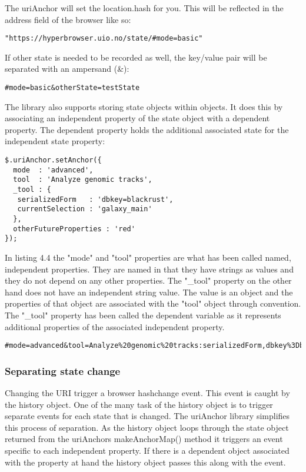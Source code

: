 \documentclass[english]{ifimaster}
\begin{document}
The uriAnchor will set the location.hash for you. This will be reflected in the address field of the browser like so: 
\begin{lstlisting}[caption=The browsers address field after using the setAnchor 
method of the uriAnchor library]
  "https://hyperbrowser.uio.no/state/#mode=basic"
\end{lstlisting}

If other state is needed to be recorded as well, the key/value pair will be separated with an ampersand (\&):

\begin{lstlisting}[caption=Standard key/value separation of the URI parameters]
  #mode=basic&otherState=testState
\end{lstlisting}

The library also supports storing state objects within objects. It does this by associating an independent property of the state object with a dependent property. The dependent property holds the additional associated state for the independent state property:

\begin{lstlisting}[caption=The UriAnchor library. Parsed complex object.]
  $.uriAnchor.setAnchor({
  mode  : 'advanced',
  tool  : 'Analyze genomic tracks',
  _tool : {
   serializedForm   : 'dbkey=blackrust',
   currentSelection : 'galaxy_main'
  },
  otherFutureProperties : 'red'
});
\end{lstlisting}

In listing 4.4 the "mode" and "tool" properties are what has been called named, independent properties. They are named in that they have strings as values and they do not depend on any other properties. The "\_tool" property on the other hand does not have an independent string value. The value is an object and the properties of that object are associated with the "tool" object through convention. The "\_tool" property has been called the dependent variable as it represents additional properties of the associated independent property. 

\begin{lstlisting}[caption=Example of a stringified complex object.]
#mode=advanced&tool=Analyze%20genomic%20tracks:serializedForm,dbkey%3Dblackrust
\end{lstlisting}



\subsubsection{Separating state change}
Changing the URI trigger a browser hashchange event. This event is caught by the history object. One of the many task of the history object is to trigger separate events for each state that is changed. The uriAnchor library simplifies this process of separation. As the history object loops through the state object returned from the uriAnchors makeAnchorMap() method it triggers an event specific to each independent property. If there is a dependent object associated with the property at hand the history object passes this along with the event. 
\end{document}
